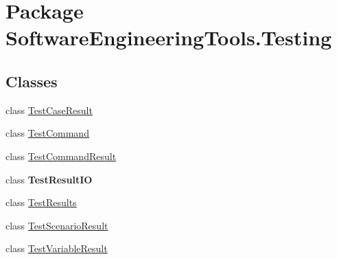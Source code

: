 \hypertarget{namespace_software_engineering_tools_1_1_testing}{\section{Package Software\+Engineering\+Tools.\+Testing}
\label{namespace_software_engineering_tools_1_1_testing}
}
\subsection*{Classes}
\begin{DoxyCompactItemize}
\item 
class \hyperlink{class_software_engineering_tools_1_1_testing_1_1_test_case_result}{Test\+Case\+Result}
\item 
class \hyperlink{class_software_engineering_tools_1_1_testing_1_1_test_command}{Test\+Command}
\item 
class \hyperlink{class_software_engineering_tools_1_1_testing_1_1_test_command_result}{Test\+Command\+Result}
\item 
class {\bfseries Test\+Result\+I\+O}
\item 
class \hyperlink{class_software_engineering_tools_1_1_testing_1_1_test_results}{Test\+Results}
\item 
class \hyperlink{class_software_engineering_tools_1_1_testing_1_1_test_scenario_result}{Test\+Scenario\+Result}
\item 
class \hyperlink{class_software_engineering_tools_1_1_testing_1_1_test_variable_result}{Test\+Variable\+Result}
\end{DoxyCompactItemize}
